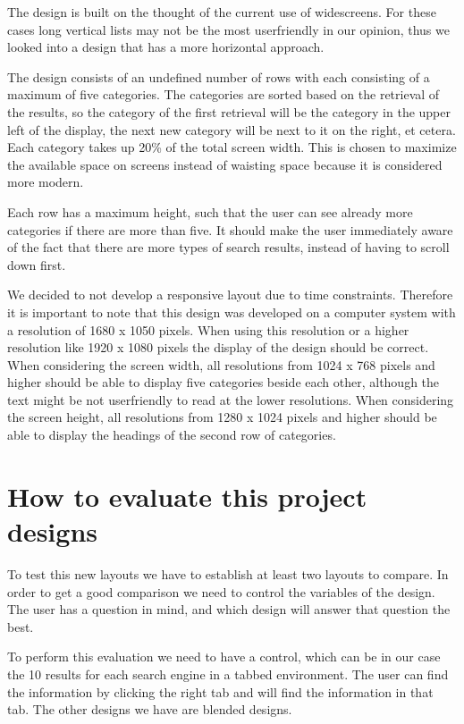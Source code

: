 \documentclass[12pt]{article}
\begin{document}
The design is built on the thought of the current use of widescreens.
For these cases long vertical lists may not be the most userfriendly in our opinion, thus we looked into a design that has a more horizontal approach.

The design consists of an undefined number of rows with each consisting of a maximum of five categories.
The categories are sorted based on the retrieval of the results, so the category of the first retrieval will be the category in the upper left of the display, the next new category will be next to it on the right, et cetera.
Each category takes up 20\% of the total screen width.
This is chosen to maximize the available space on screens instead of waisting space because it is considered more modern.

Each row has a maximum height, such that the user can see already more categories if there are more than five.
It should make the user immediately aware of the fact that there are more types of search results, instead of having to scroll down first.

We decided to not develop a responsive layout due to time constraints.
Therefore it is important to note that this design was developed on a computer system with a resolution of 1680 x 1050 pixels.
When using this resolution or a higher resolution like 1920 x 1080 pixels the display of the design should be correct.
When considering the screen width, all resolutions from 1024 x 768 pixels and higher should be able to display five categories beside each other, although the text might be not userfriendly to read at the lower resolutions.
When considering the screen height, all resolutions from 1280 x 1024 pixels and higher should be able to display the headings of the second row of categories.


\section{How to evaluate this project designs}
\label{sec:evaluation}
To test this new layouts we have to establish at least two layouts to compare. In order to get a good comparison we need to control the variables of the design. The user has a question in mind, and which design will answer that question the best. 

To perform this evaluation we need to have a control, which can be in our case the 10 results for each search engine in a tabbed environment. The user can find the information by clicking the right tab and will find the information in that tab. The other designs we have are blended designs.
\end{document}
